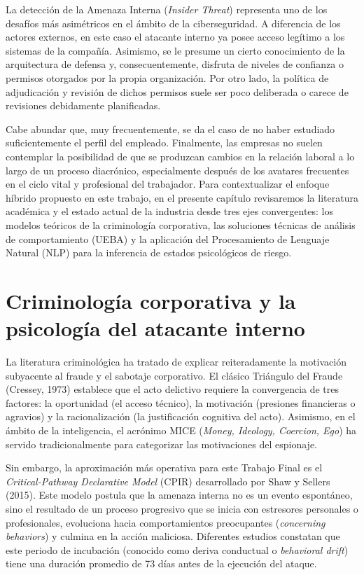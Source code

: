 \documentclass[IB]{TFUOC}%
\begin{document}
La detección de la Amenaza Interna (\textit{Insider Threat}) representa uno de los desafíos más asimétricos en el ámbito de la ciberseguridad. A diferencia de los actores externos, en este caso el atacante interno ya posee acceso legítimo a los sistemas de la compañía. Asimismo, se le presume un cierto conocimiento de la arquitectura de defensa y, consecuentemente, disfruta de niveles de confianza o permisos otorgados por la propia organización. Por otro lado, la política de adjudicación y revisión de dichos permisos suele ser poco deliberada o carece de revisiones debidamente planificadas. 

\medskip
\noindent Cabe abundar que, muy frecuentemente, se da el caso de no haber estudiado suficientemente el perfil del empleado. Finalmente, las empresas no suelen contemplar la posibilidad de que se produzcan cambios en la relación laboral a lo largo de un proceso diacrónico, especialmente después de los avatares frecuentes en el ciclo vital y profesional del trabajador. Para contextualizar el enfoque híbrido propuesto en este trabajo, en el presente capítulo revisaremos la literatura académica y el estado actual de la industria desde tres ejes convergentes: los modelos teóricos de la criminología corporativa, las soluciones técnicas de análisis de comportamiento (UEBA) y la aplicación del Procesamiento de Lenguaje Natural (NLP) para la inferencia de estados psicológicos de riesgo.

\section{Criminología corporativa y la psicología del atacante interno}

La literatura criminológica ha tratado de explicar reiteradamente la motivación subyacente al fraude y el sabotaje corporativo. El clásico Triángulo del Fraude (Cressey, 1973) establece que el acto delictivo requiere la convergencia de tres factores: la oportunidad (el acceso técnico), la motivación (presiones financieras o agravios) y la racionalización (la justificación cognitiva del acto). Asimismo, en el ámbito de la inteligencia, el acrónimo MICE (\textit{Money, Ideology, Coercion, Ego}) ha servido tradicionalmente para categorizar las motivaciones del espionaje.

\medskip
\noindent Sin embargo, la aproximación más operativa para este Trabajo Final es el \textit{Critical-Pathway Declarative Model} (CPIR) desarrollado por Shaw y Sellers (2015). Este modelo postula que la amenaza interna no es un evento espontáneo, sino el resultado de un proceso progresivo que se inicia con estresores personales o profesionales, evoluciona hacia comportamientos preocupantes (\textit{concerning behaviors}) y culmina en la acción maliciosa. Diferentes estudios constatan que este periodo de incubación (conocido como deriva conductual o \textit{behavioral drift}) tiene una duración promedio de 73 días antes de la ejecución del ataque.
\end{document}

